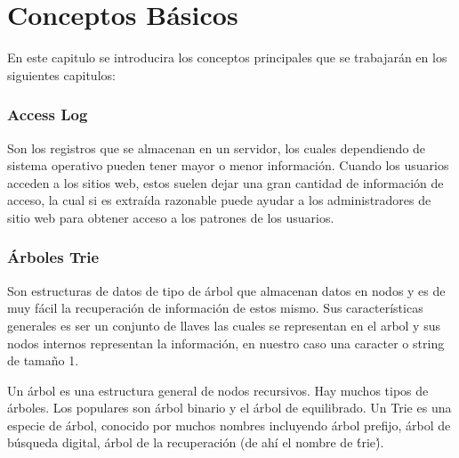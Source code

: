 \chapter[Conceptos Básicos]{Conceptos Básicos}
\label{ch:Conceptos-Basicos}





En este capitulo se introducira los conceptos principales que se trabajarán en los siguientes capitulos:




\subsection{Access Log}

Son los registros que se almacenan en un servidor, los cuales dependiendo de sistema operativo pueden tener mayor o menor información. Cuando los usuarios acceden a los sitios web, estos  suelen dejar una gran cantidad de información de acceso, la cual si es extraída razonable puede ayudar a los administradores de sitio web para obtener acceso a los patrones de los usuarios. 


\subsection{Árboles Trie}



Son estructuras de datos de tipo de árbol que almacenan datos en nodos y es de muy fácil la recuperación de información de estos mismo. Sus características generales es ser un conjunto de llaves las cuales se representan en el arbol y sus nodos internos representan la información, en nuestro caso una caracter o string de tamaño 1.

Un árbol es una estructura general de nodos recursivos. Hay muchos tipos de árboles. Los populares son árbol binario y el árbol de equilibrado. Un Trie es una especie de árbol, conocido por muchos nombres incluyendo árbol prefijo, árbol de búsqueda digital, árbol de la recuperación (de ahí el nombre de \'trie\').

